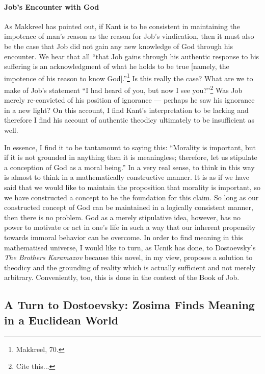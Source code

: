 \documentclass[12pt]{article}
\begin{document}
	\paragraph*{Job's Encounter with God} As Makkreel has pointed out, if Kant is to be consistent in maintaining the impotence of man's reason as the reason for Job's vindication, then it must also be the case that Job did not gain any new knowledge of God through his encounter. We hear that all ``that Job gains through his authentic response to his suffering is an acknowledgment of what he holds to be true [namely, the impotence of his reason to know God].''\footnote{Makkreel, 70.} Is this really the case? What are we to make of Job's statement ``I had heard of you, but now I see you?''\footnote{Cite this...} Was Job merely re-convicted of his position of ignorance --- perhaps he saw his ignorance in a new light? On this account, I find Kant's interpretation to be lacking and therefore I find his account of authentic theodicy ultimately to be insufficient as well. 
	
	In essence, I find it to be tantamount to saying this: ``Morality is important, but if it is not grounded in anything then it is meaningless; therefore, let us stipulate a conception of God as a moral being.'' In a very real sense, to think in this way is almost to think in a mathematically constructive manner. It is as if we have said that we would like to maintain the proposition that morality is important, so we have constructed a concept to be the foundation for this claim. So long as our constructed concept of God can be maintained in a logically consistent manner, then there is no problem. God as a merely stipulative idea, however, has no power to motivate or act in one's life in such a way that our inherent propensity towards immoral behavior can be overcome. In order to find meaning in this mathematised universe, I would like to turn, as Ucnik has done, to Dostoevsky's \emph{The Brothers Karamazov} because this novel, in my view, proposes a solution to theodicy and the grounding of reality which is actually sufficient and not merely arbitrary. Conveniently, too, this is done in the context of the Book of Job. 
	
	\subsection*{A Turn to Dostoevsky: Zosima Finds Meaning in a Euclidean World}
	
\end{document}
